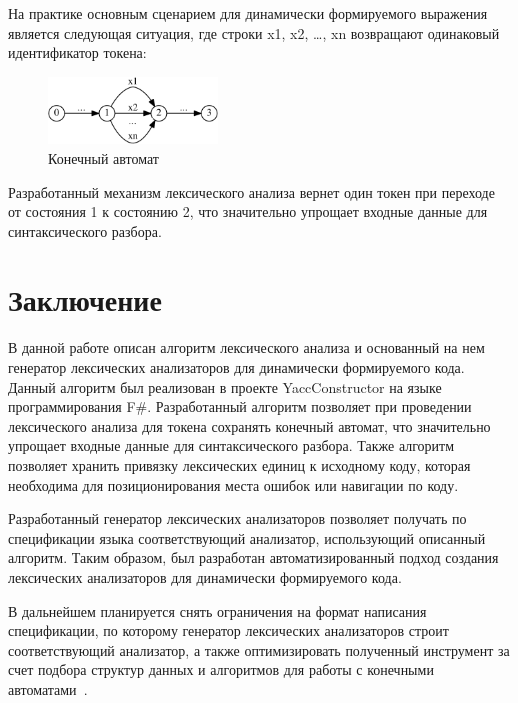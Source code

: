 \documentclass[10pt, conference, compsocconf]{IEEEtran}
\begin{document}
На практике основным сценарием для динамически формируемого выражения является следующая ситуация, где строки x1, x2, \ldots, xn возвращают одинаковый идентификатор токена:

\begin{figure}[h]
\centering
\includegraphics[width=0.4\textwidth]{pics/n_ex}
\caption{Конечный автомат}
\label{fig:fsa_n}
\end{figure}

Разработанный механизм лексического анализа вернет один токен при переходе от состояния 1 к  состоянию 2, что значительно упрощает входные данные для синтаксического разбора.

\section{Заключение}

В данной работе описан алгоритм лексического анализа и основанный на нем генератор лексических анализаторов для динамически формируемого кода. Данный алгоритм был реализован в проекте YaccConstructor на языке программирования F\#. Разработанный алгоритм позволяет при проведении лексического анализа для токена сохранять конечный автомат, что значительно упрощает входные данные для синтаксического разбора. Также алгоритм позволяет хранить привязку лексических единиц к исходному коду, которая необходима для позиционирования места ошибок или навигации по коду. 

Разработанный генератор лексических анализаторов позволяет получать по спецификации языка соответствующий анализатор, использующий описанный алгоритм. Таким образом, был разработан автоматизированный подход создания лексических анализаторов для динамически формируемого кода.

В дальнейшем планируется снять ограничения на формат написания спецификации, по которому генератор лексических анализаторов строит соответствующий анализатор, а также оптимизировать полученный инструмент  за счет подбора структур данных и алгоритмов для работы с конечными автоматами~\cite{AlgoFSA}.

\nocite{*}
\def\BibTeX{BibTeX}



\end{document}
